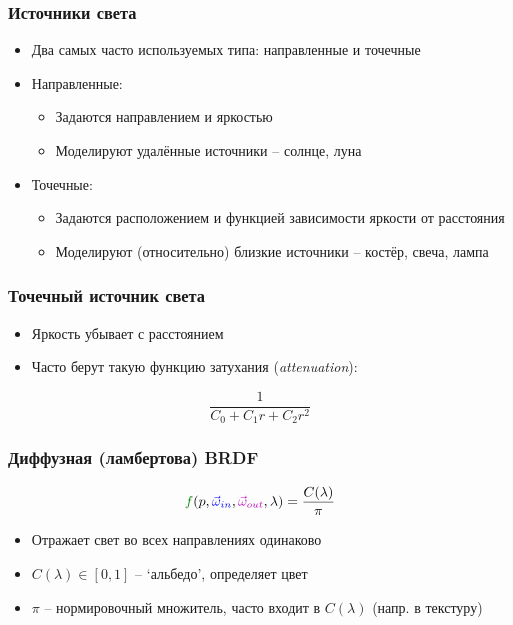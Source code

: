\documentclass[10pt]{beamer}
\begin{document}
\begin{frame}[fragile]
\frametitle{Источники света}
\begin{itemize}
\item Два самых часто используемых типа: направленные и точечные
\pause
\item Направленные:
\pause
\begin{itemize}
\item Задаются направлением и яркостью
\pause
\item Моделируют удалённые источники -- солнце, луна
\end{itemize}
\pause
\item Точечные:
\pause
\begin{itemize}
\item Задаются расположением и функцией зависимости яркости от расстояния
\pause
\item Моделируют (относительно) близкие источники -- костёр, свеча, лампа
\end{itemize}
\end{itemize}
\end{frame}

\begin{frame}[fragile]
\frametitle{Точечный источник света}
\begin{itemize}
\item Яркость убывает с расстоянием
\pause
\item Часто берут такую функцию затухания (\textit{attenuation}):
\end{itemize}
\begin{equation*}
\frac{1}{C_0 + C_1 r + C_2 r^2}
\end{equation*}
\end{frame}

\begin{frame}[fragile]
\frametitle{Диффузная (ламбертова) BRDF}
\begin{equation*}
{\color{green}f}(p, {\color{blue}\vec\omega_{in}}, {\color{magenta}\vec\omega_{out}}, \lambda) = \frac{C(\lambda)}{\pi}
\end{equation*}
\begin{itemize}
\item Отражает свет во всех направлениях одинаково
\item \begin{math}C(\lambda) \in [0, 1]\end{math} -- `альбедо', определяет цвет
\item \begin{math}\pi\end{math} -- нормировочный множитель, часто входит в \begin{math}C(\lambda)\end{math} (напр. в текстуру)
\end{itemize}
\end{frame}
\end{document}
